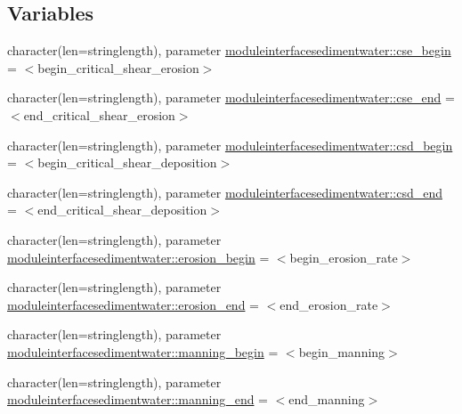 \subsection*{Variables}
\begin{DoxyCompactItemize}
\item 
character(len=stringlength), parameter \mbox{\hyperlink{namespacemoduleinterfacesedimentwater_a8a2e2d91de512377ff662127855dca5c}{moduleinterfacesedimentwater\+::cse\+\_\+begin}} = \textquotesingle{}$<$begin\+\_\+critical\+\_\+shear\+\_\+erosion$>$\textquotesingle{}
\item 
character(len=stringlength), parameter \mbox{\hyperlink{namespacemoduleinterfacesedimentwater_a80a2efdf5ac61c5cc429f5e61c6ef6d4}{moduleinterfacesedimentwater\+::cse\+\_\+end}} = \textquotesingle{}$<$end\+\_\+critical\+\_\+shear\+\_\+erosion$>$\textquotesingle{}
\item 
character(len=stringlength), parameter \mbox{\hyperlink{namespacemoduleinterfacesedimentwater_a2d30cd676cd88044ba1e401fea344d71}{moduleinterfacesedimentwater\+::csd\+\_\+begin}} = \textquotesingle{}$<$begin\+\_\+critical\+\_\+shear\+\_\+deposition$>$\textquotesingle{}
\item 
character(len=stringlength), parameter \mbox{\hyperlink{namespacemoduleinterfacesedimentwater_ab4681bf40a9030287a7b3487a734cc61}{moduleinterfacesedimentwater\+::csd\+\_\+end}} = \textquotesingle{}$<$end\+\_\+critical\+\_\+shear\+\_\+deposition$>$\textquotesingle{}
\item 
character(len=stringlength), parameter \mbox{\hyperlink{namespacemoduleinterfacesedimentwater_abea11c747919e453084a12286b21882e}{moduleinterfacesedimentwater\+::erosion\+\_\+begin}} = \textquotesingle{}$<$begin\+\_\+erosion\+\_\+rate$>$\textquotesingle{}
\item 
character(len=stringlength), parameter \mbox{\hyperlink{namespacemoduleinterfacesedimentwater_a3cb4b5cf7ff53feece75ccaee001fca9}{moduleinterfacesedimentwater\+::erosion\+\_\+end}} = \textquotesingle{}$<$end\+\_\+erosion\+\_\+rate$>$\textquotesingle{}
\item 
character(len=stringlength), parameter \mbox{\hyperlink{namespacemoduleinterfacesedimentwater_a660a5cd15ce4aae073a332efcee6c90c}{moduleinterfacesedimentwater\+::manning\+\_\+begin}} = \textquotesingle{}$<$begin\+\_\+manning$>$\textquotesingle{}
\item 
character(len=stringlength), parameter \mbox{\hyperlink{namespacemoduleinterfacesedimentwater_a8e67f5acac1750fb6b898ad1f03f512a}{moduleinterfacesedimentwater\+::manning\+\_\+end}} = \textquotesingle{}$<$end\+\_\+manning$>$\textquotesingle{}

\end{DoxyCompactItemize}
